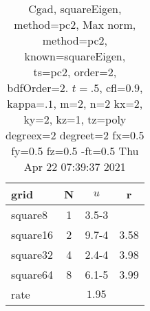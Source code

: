 \begin{table}[H]\tableFont %
\begin{center}
\begin{tabular}{|l|c|c|c|} \hline 
grid  & N &  $ u $ & r \\ \hline 
   square8 &     1 & \num{3.5}{-3} &        \\ \hline
  square16 &     2 & \num{9.7}{-4} &  3.58  \\ \hline
  square32 &     4 & \num{2.4}{-4} &  3.98  \\ \hline
  square64 &     8 & \num{6.1}{-5} &  3.99  \\ \hline
    rate             &       &  $1.95$       &       \\ \hline
\end{tabular}
\caption{Cgad, squareEigen, method=pc2, Max norm, method=pc2, known=squareEigen, ts=pc2, order=$2$, bdfOrder=2. $t=.5$, cfl=$0.9$, kappa=$.1$, m=2, n=2 kx=2, ky=2, kz=1,  tz=poly degreex=2 degreet=2 fx=0.5 fy=0.5 fz=0.5 -ft=0.5 Thu Apr 22 07:39:37 2021}\label{table:squareEigenpc2Order2Max}
\end{center}
\end{table}
